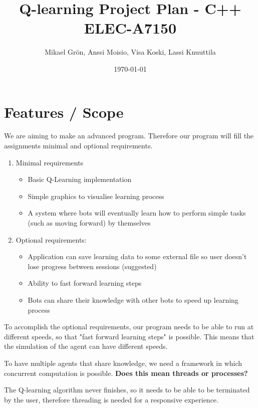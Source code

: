\documentclass{article}
\author{Mikael Grön, Anssi Moisio, Visa Koski, Lassi Knuuttila}
\title{Q-learning Project Plan - C++ ELEC-A7150}
\date{\today}
\begin{document}
\maketitle

\tableofcontents
\newpage

\section{Features / Scope}
We are aiming to make an advanced program. Therefore our program will fill
the assignments minimal and optional requirements.

\begin{enumerate}
\item Minimal requirements
    \begin{itemize}
    \item Basic Q-Learning implementation
    \item Simple graphics to visualise learning process
    \item A system where bots will eventually learn how to perform simple
    tasks (such as moving forward) by themselves
    \end{itemize}
\item Optional requirements:
    \begin{itemize}
    \item Application can save learning data to some external file so user
    doesn't lose progress between sessions (suggested)
    \item Ability to fast forward learning steps
    \item Bots can share their knowledge with other bots to speed up learning
    process
    \end{itemize}
\end{enumerate}

To accomplish the optional requirements, our program needs to be able to run
at different speeds, so that "fast forward learning steps" is possible. This
means that the simulation of the agent can have different speeds.

To have multiple agents that share knowledge, we need a framework in which
concurrent computation is possible. \textbf{Does this mean threads or
processes?}

The Q-learning algorithm never finishes, so it needs to be able to be terminated
by the user, therefore threading is needed for a responsive experience.
\end{document}
